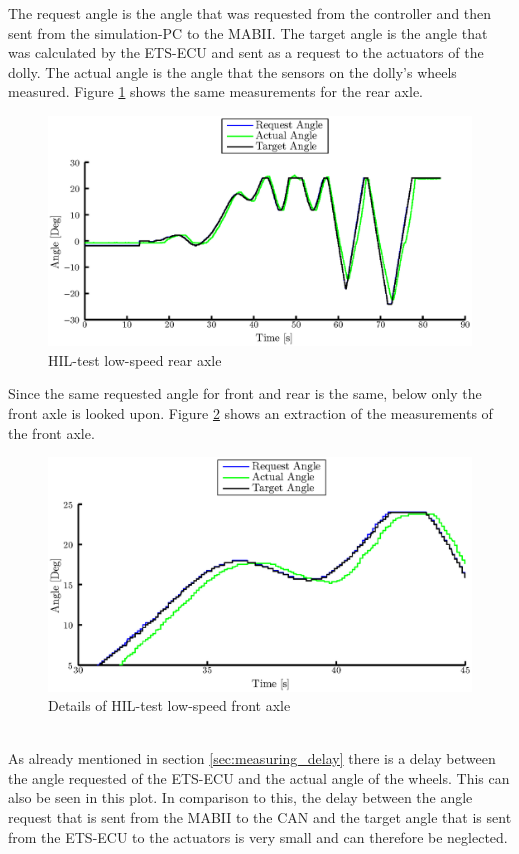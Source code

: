 \documentclass[ExampleMasters.tex]{subfiles}
\begin{document}
The request angle is the angle that was requested from the controller and then sent from the simulation-PC to the MABII. The target angle is the angle that was calculated by the ETS-ECU and sent as a request to the actuators of the dolly. The actual angle is the angle that the sensors on the dolly's wheels measured.
Figure \ref{fig:HIL002_rear} shows the same measurements for the rear axle.

\begin{figure}[!htb]
	\centering
	\includegraphics[width=1\linewidth]{figures/HIL002_rear}
	\caption{HIL-test low-speed rear axle}
	
	\label{fig:HIL002_rear}
\end{figure}
Since the same requested angle for front and rear is the same, below only the front axle is looked upon.
Figure \ref{fig:HIL002_front_closeup} shows an extraction of the measurements of the front axle. 
\begin{figure}[!htb]
	\centering
	\includegraphics[width=1\linewidth]{figures/HIL002_front_closeup}
	\caption{Details of HIL-test low-speed front axle}
	
	\label{fig:HIL002_front_closeup}
\end{figure} \\
As already mentioned in section \ref{sec:measuring_delay} there is a delay between the angle requested of the ETS-ECU and the actual angle of the wheels. This can also be seen in this plot. In comparison to this, the delay between the angle request that is sent from the MABII to the CAN and the target angle that is sent from the ETS-ECU to the actuators is very small and can therefore be neglected.\\
\end{document}
